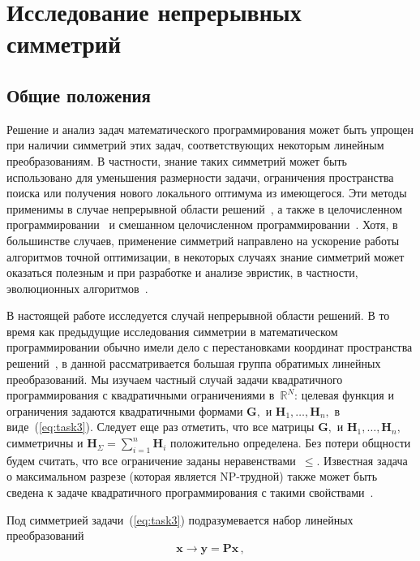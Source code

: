 \section{Исследование непрерывных симметрий}

\subsection{Общие положения}
Решение и анализ задач математического программирования может быть упрощен при наличии симметрий этих задач, соответствующих некоторым линейным преобразованиям. В частности, знание таких симметрий может быть использовано для уменьшения размерности задачи, ограничения пространства поиска или получения нового локального оптимума из имеющегося. Эти методы применимы в
случае непрерывной области решений~\cite{CHL13,GATERMANN200495,KWM19}, а также в целочисленном программировании~\cite{BHJ13,C99,Kolokolov2012,Margot2010,Simanchev96} и смешанном целочисленном программировании~\cite{L12,PR19}.
Хотя, в большинстве случаев, применение симметрий направлено на ускорение работы алгоритмов точной оптимизации, в некоторых случаях знание симметрий может оказаться полезным и при разработке и анализе эвристик, в частности, эволюционных алгоритмов~\cite{Doerr21,Adam2004}.

В настоящей работе исследуется случай непрерывной области решений. В то время как предыдущие исследования симметрии в математическом программировании обычно имели дело с перестановками координат пространства решений~\cite{Kolokolov2012,KWM19,L12}, в данной рассматривается большая группа обратимых линейных преобразований. Мы изучаем частный случай задачи квадратичного программирования с квадратичными ограничениями в~${\mathbb R}^N$: целевая функция и ограничения задаются квадратичными формами $\textbf{G}, $ и $\textbf{H}_1,\dots,\textbf{H}_n,$ в виде~(\ref{eq:task3}). Следует еще раз отметить, что все матрицы $\textbf{G}, $ и $\textbf{H}_1,\dots,\textbf{H}_n,$ симметричны и $\textbf{H}_\Sigma = \sum_{i=1}^{n}\textbf{H}_i$ положительно определена. 
Без потери общности будем считать, что все ограничение заданы неравенствами~$\le$.
Известная задача о максимальном разрезе (которая является NP-трудной) также может быть сведена к задаче квадратичного программирования с такими свойствами~\cite{Shor1998}.

Под симметрией задачи~(\ref{eq:task3}) подразумевается набор линейных преобразований
\begin{equation}
\label{eq:Lin}
\textbf{x} \to \textbf{y}=\textbf{Px} \, ,
\end{equation}
%

